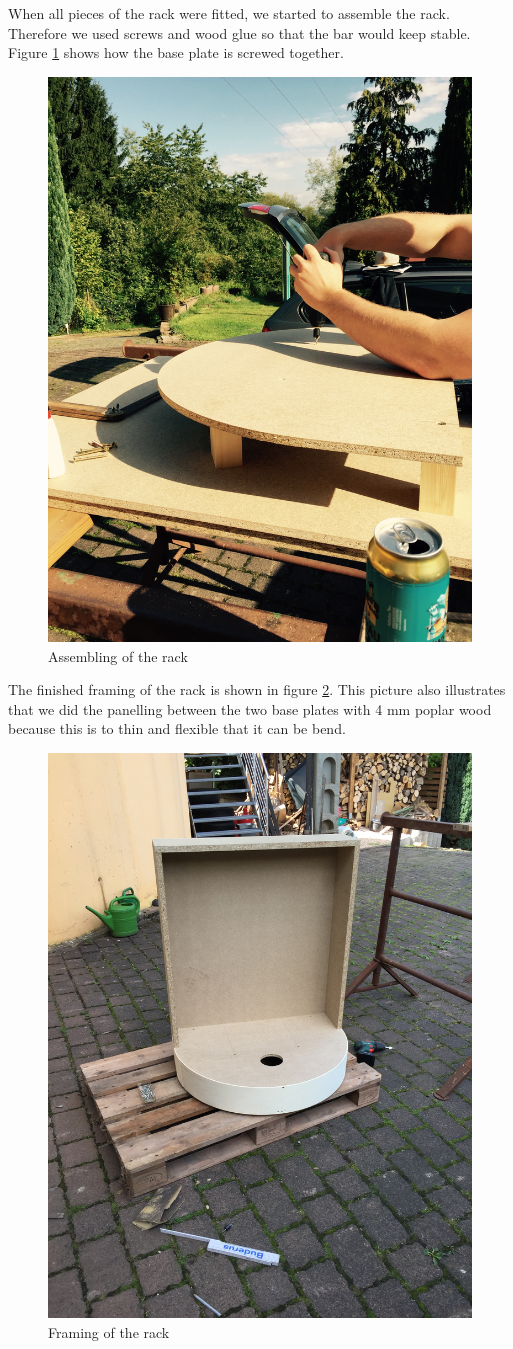 \documentclass{acm_proc_article-sp}
\begin{document}
When all pieces of the rack were fitted, we started to assemble the rack. Therefore we used screws and wood glue so that the bar would keep stable. Figure \ref{fig:assembling} shows how the base plate is screwed together.

\begin{figure}[htbp] 
  \centering
     \includegraphics[width=0.5\linewidth]{pictures/assembling.jpg}
  \caption{Assembling of the rack}
  \label{fig:assembling}
\end{figure}

The finished framing of the rack is shown in figure \ref{fig:framing}. This picture also illustrates that we did the panelling between the two base plates with 4 mm poplar wood because this is to thin and flexible that it can be bend.

\begin{figure}[htbp] 
  \centering
     \includegraphics[width=0.6\linewidth, angle =270]{pictures/rack2.jpg}
  \caption{Framing of the rack}
  \label{fig:framing}
\end{figure}
\end{document}

